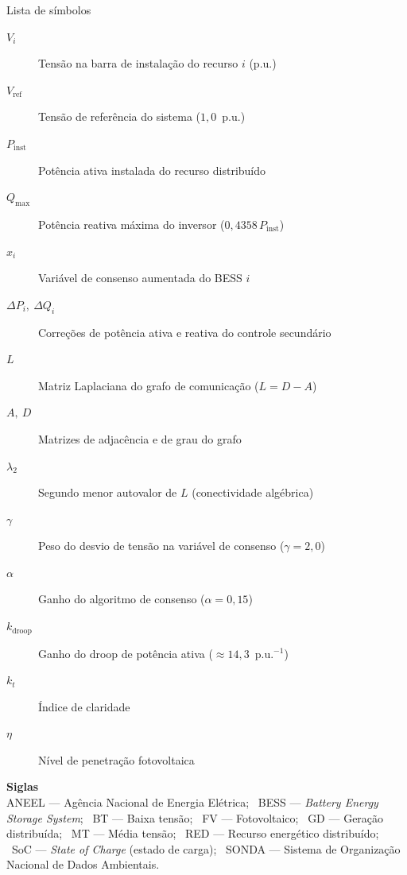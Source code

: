 \documentclass[pnumromarab,normalnum,abnttoc,times]{politex}
\begin{document}
\begin{pretextualsection}{Lista de símbolos}
\begin{description}
  \item[$V_i$] Tensão na barra de instalação do recurso $i$ (p.u.)
  \item[$V_\text{ref}$] Tensão de referência do sistema ($1{,}0$~p.u.)
  \item[$P_\text{inst}$] Potência ativa instalada do recurso distribuído
  \item[$Q_\text{max}$] Potência reativa máxima do inversor ($0{,}4358\,P_\text{inst}$)
  \item[$x_i$] Variável de consenso aumentada do BESS $i$
  \item[$\Delta P_i,\ \Delta Q_i$] Correções de potência ativa e reativa do controle secundário
  \item[$L$] Matriz Laplaciana do grafo de comunicação ($L = D - A$)
  \item[$A,\ D$] Matrizes de adjacência e de grau do grafo
  \item[$\lambda_2$] Segundo menor autovalor de $L$ (conectividade algébrica)
  \item[$\gamma$] Peso do desvio de tensão na variável de consenso ($\gamma = 2{,}0$)
  \item[$\alpha$] Ganho do algoritmo de consenso ($\alpha = 0{,}15$)
  \item[$k_\text{droop}$] Ganho do droop de potência ativa ($\approx 14{,}3$~p.u.$^{-1}$)
  \item[$k_t$] Índice de claridade
  \item[$\eta$] Nível de penetração fotovoltaica
\end{description}

\vspace{0.5cm}
\noindent\textbf{Siglas} \\
ANEEL — Agência Nacional de Energia Elétrica; \
BESS — \emph{Battery Energy Storage System}; \
BT — Baixa tensão; \
FV — Fotovoltaico; \
GD — Geração distribuída; \
MT — Média tensão; \
RED — Recurso energético distribuído; \
SoC — \emph{State of Charge} (estado de carga); \
SONDA — Sistema de Organização Nacional de Dados Ambientais.
\end{pretextualsection}

\sumario








\end{document}

